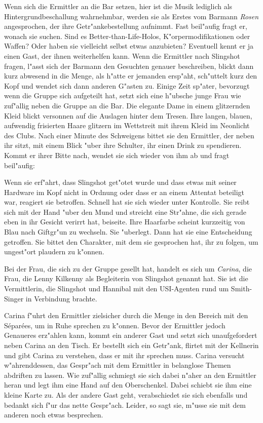 Wenn sich die Ermittler an die Bar setzen, hier ist die Musik lediglich als Hintergrundbeschallung wahrnehmbar, werden sie als Erstes vom Barmann \emph{Rosen} angesprochen, der ihre Getr"ankebestellung aufnimmt. Fast beil"aufig fragt er, wonach sie suchen. Sind es Better-than-Life-Holos, K"orpermodifikationen oder Waffen? Oder haben sie vielleicht selbst etwas anzubieten? Eventuell kennt er ja einen Gast, der ihnen weiterhelfen kann. Wenn die Ermittler nach Slingshot fragen, l"asst sich der Barmann den Gesuchten genauer beschreiben, blickt dann kurz abwesend in die Menge, als h"atte er jemanden ersp"aht, sch"uttelt kurz den Kopf und wendet sich dann anderen G"asten zu. Einige Zeit sp"ater, bevorzugt wenn die Gruppe sich aufgeteilt hat, setzt sich eine h"ubsche junge Frau wie zuf"allig neben die Gruppe an die Bar. Die elegante Dame in einem glitzernden Kleid blickt versonnen auf die Auslagen hinter dem Tresen. Ihre langen, blauen, aufwendig frisierten Haare glitzern im Wettstreit mit ihrem Kleid im Neonlicht des Clubs. Nach einer Minute des Schweigens bittet sie den Ermittler, der neben ihr sitzt, mit einem Blick "uber ihre Schulter, ihr einen Drink zu spendieren. Kommt er ihrer Bitte nach, wendet sie sich wieder von ihm ab und fragt beil"aufig:


Wenn sie erf"ahrt, dass Slingshot get"otet wurde und dass etwas mit seiner Hardware im Kopf nicht in Ordnung oder dass er an einem Attentat beteiligt war, reagiert sie betroffen. Schnell hat sie sich wieder unter Kontrolle. Sie reibt sich mit der Hand "uber den Mund und streicht eine Str"ahne, die sich gerade eben in ihr Gesicht verirrt hat, beiseite. Ihre Haarfarbe scheint kurzzeitig von Blau nach Giftgr"un zu wechseln. Sie "uberlegt. Dann hat sie eine Entscheidung getroffen. Sie bittet den Charakter, mit dem sie gesprochen hat, ihr zu folgen, um ungest"ort plaudern zu k"onnen.

Bei der Frau, die sich zu der Gruppe gesellt hat, handelt es sich um \emph{Carina}, die Frau, die Lenny Kilkenny als Begleiterin von Slingshot genannt hat. Sie ist die Vermittlerin, die Slingshot und Hannibal mit den USI-Agenten rund um Smith-Singer in Verbindung brachte.

Carina f"uhrt den Ermittler zielsicher durch die Menge in den Bereich mit den S\'epar\'ees, um in Ruhe sprechen zu k"onnen. Bevor der Ermittler jedoch Genaueres erz"ahlen kann, kommt ein anderer Gast und setzt sich unaufgefordert neben Carina an den Tisch. Er bestellt sich ein Getr"ank, flirtet mit der Kellnerin und gibt Carina zu verstehen, dass er mit ihr sprechen muss. Carina versucht w"ahrenddessen, das Gespr"ach mit dem Ermittler in belanglose Themen abdriften zu lassen. Wie zuf"allig schmiegt sie sich dabei n"aher an den Ermittler heran und legt ihm eine Hand auf den Oberschenkel. Dabei schiebt sie ihm eine kleine Karte zu. Als der andere Gast geht, verabschiedet sie sich ebenfalls und bedankt sich f"ur das nette Gespr"ach. Leider, so sagt sie, m"usse sie mit dem anderen noch etwas besprechen.


